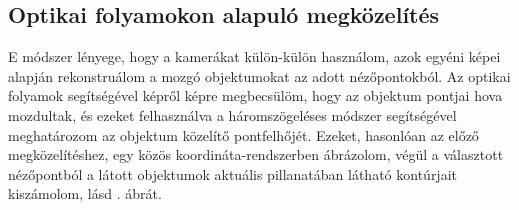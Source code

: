 \subsection{Optikai folyamokon alapuló megközelítés}

E módszer lényege, hogy a kamerákat külön-külön használom, azok egyéni képei alapján rekonstruálom a mozgó objektumokat az adott nézőpontokból. Az optikai folyamok segítségével képről képre megbecsülöm, hogy az objektum pontjai hova mozdultak, és ezeket felhasználva a háromszögeléses módszer segítségével meghatározom az objektum közelítő pontfelhőjét. Ezeket, hasonlóan az előző megközelítéshez, egy közös koordináta-rendszerben ábrázolom, végül a választott nézőpontból a látott objektumok aktuális pillanatában látható kontúrjait kiszámolom, lásd . ábrát.

